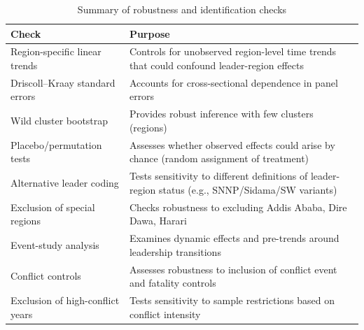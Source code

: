 \begin{table}[ht]
\centering
\caption{Summary of robustness and identification checks}
\begin{tabular}{p{}p{}}
\toprule
Check & Purpose \\
\midrule
Region-specific linear trends & Controls for unobserved region-level time trends that could confound leader-region effects \\
Driscoll--Kraay standard errors & Accounts for cross-sectional dependence in panel errors \\
Wild cluster bootstrap & Provides robust inference with few clusters (regions) \\
Placebo/permutation tests & Assesses whether observed effects could arise by chance (random assignment of treatment) \\
Alternative leader coding & Tests sensitivity to different definitions of leader-region status (e.g., SNNP/Sidama/SW variants) \\
Exclusion of special regions & Checks robustness to excluding Addis Ababa, Dire Dawa, Harari \\
Event-study analysis & Examines dynamic effects and pre-trends around leadership transitions \\
Conflict controls & Assesses robustness to inclusion of conflict event and fatality controls \\
Exclusion of high-conflict years & Tests sensitivity to sample restrictions based on conflict intensity \\
\bottomrule
\end{tabular}
\label{tab:robustness_identification}
\end{table}
